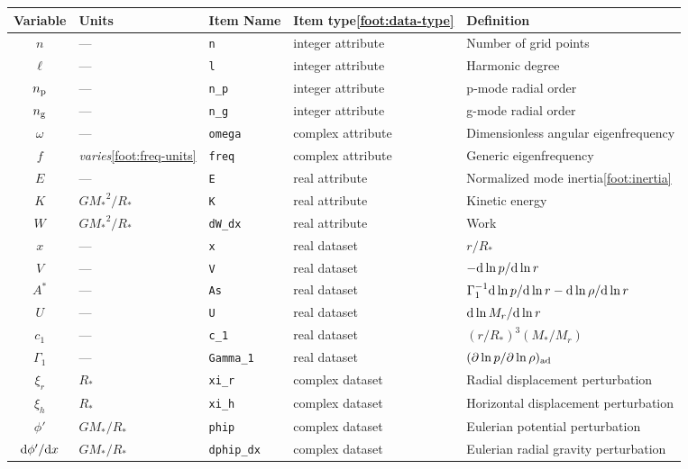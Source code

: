 \documentclass{article}
\newcommand{\diff}{\ensuremath{{\rm d}}}
\newcommand{\Rstar}{\ensuremath{R_{\ast}}}
\newcommand{\Mstar}{\ensuremath{M_{\ast}}}
\begin{document}
\begin{center}
\begin{longtable}{cllll} \hline
Variable & Units & Item Name & Item type\cref{foot:data-type} & Definition \\ \hline
$n$ & --- & \texttt{n} & integer attribute & Number of grid points \\
$\ell$ & --- & \texttt{l} & integer attribute & Harmonic degree \\
$n_{\rm p}$ & --- & \texttt{n\_p} & integer attribute & p-mode radial order \\
$n_{\rm g}$ & --- & \texttt{n\_g} & integer attribute & g-mode radial order \\
$\omega$ & ---   & \texttt{omega} & complex attribute & Dimensionless angular eigenfrequency \\
$f$      & \emph{varies}\cref{foot:freq-units} & \texttt{freq} & complex attribute & Generic eigenfrequency \\
$E$ & --- & \texttt{E} & real attribute & Normalized mode inertia\cref{foot:inertia} \\
$K$ & $G\Mstar^{2}/\Rstar$ & \texttt{K} & real attribute & Kinetic energy \\ 
$W$ & $G\Mstar^{2}/\Rstar$ & \texttt{dW\_dx} & real attribute & Work \\
$x$ & --- & \texttt{x} & real dataset & $r/\Rstar$ \\
$V$ & --- & \texttt{V} & real dataset & $-\diff \ln p/\diff \ln r$ \\
$A^{\ast}$ & --- & \texttt{As} & real dataset & $\Gamma_{1}^{-1} \diff \ln p/\diff \ln r - \diff \ln \rho/\diff \ln r$ \\
$U$ & --- & \texttt{U} & real dataset & $\diff \ln M_{r}/\diff \ln r$ \\
$c_{1}$ & --- & \texttt{c\_1} & real dataset & $(r/\Rstar)^{3} (\Mstar/M_{r})$ \\
$\Gamma_{1}$ & --- & \texttt{Gamma\_1} & real dataset & $(\partial \ln p/\partial \ln \rho)_{\rm ad}$ \\
$\xi_{r}$ & \Rstar & \texttt{xi\_r} & complex dataset & Radial displacement perturbation \\
$\xi_{h}$ & \Rstar & \texttt{xi\_h} & complex dataset & Horizontal displacement perturbation \\
$\phi'$ & $G\Mstar/\Rstar$ & \texttt{phip} & complex dataset & Eulerian potential perturbation \\
$\diff\phi'/\diff x$ & $G\Mstar/\Rstar$ & \texttt{dphip\_dx} & complex dataset & Eulerian radial gravity perturbation \\

\end{longtable}
\end{center}
\end{document}
